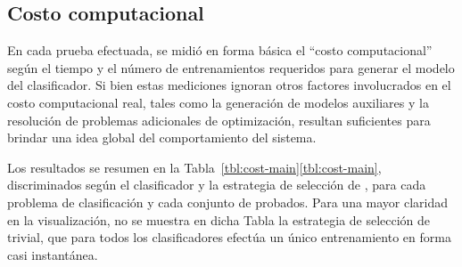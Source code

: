 %
%
\subsection{Costo computacional}
%
En cada prueba efectuada, se midió en forma básica el ``costo
computacional'' según el tiempo y el número de entrenamientos
requeridos para generar el modelo del clasificador.
Si bien estas mediciones ignoran otros factores involucrados en el
costo computacional real, tales como la generación de modelos
auxiliares y la resolución de problemas adicionales de optimización,
resultan suficientes para brindar una idea global del comportamiento
del sistema.

Los resultados se resumen en la
\iflatexml{}Tabla~\ref{tbl:cost-main}\else\autoref{tbl:cost-main}\fi{},
discriminados según el clasificador y la estrategia de selección de
, para cada problema de clasificación y cada conjunto de
 probados.
Para una mayor claridad en la visualización, no se muestra en dicha
Tabla la estrategia de selección de  trivial, que para todos
los clasificadores efectúa un único entrenamiento en forma casi
instantánea.
